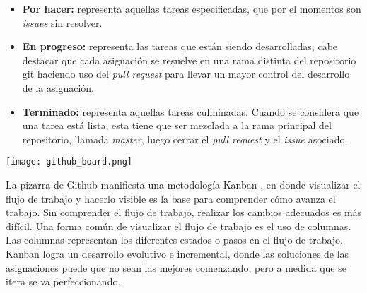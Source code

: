 \begin{itemize}
\item\textbf{Por hacer:} representa aquellas tareas especificadas, que por el momentos son \textit{issues} sin resolver.
\item\textbf{En progreso:} representa las tareas que están siendo desarrolladas, cabe destacar que cada asignación se resuelve en una rama distinta del repositorio git haciendo uso del \textit{pull request} para llevar un mayor control del desarrollo de la asignación.
\item\textbf{Terminado:} representa aquellas tareas culminadas. Cuando se considera que una tarea está lista, esta tiene que ser mezclada a la rama principal del repositorio, llamada \textit{master}, luego cerrar el \textit{pull request} y el \textit{issue} asociado.
\end{itemize}
\bigbreak
\begin{center}
\texttt{[image: github\_board.png]}
\label{fig:githubBoard}
\end{center}
\bigbreak
La pizarra de Github manifiesta una metodología Kanban \cite{BookKanban}, en donde visualizar el flujo de trabajo y hacerlo visible es la base para comprender cómo avanza el trabajo. Sin comprender el flujo de trabajo, realizar los cambios adecuados es más difícil. Una forma común de visualizar el flujo de trabajo es el uso de columnas. Las columnas representan los diferentes estados o pasos en el flujo de trabajo. Kanban logra un desarrollo evolutivo e incremental, donde las soluciones de las asignaciones puede que no sean las mejores comenzando, pero a medida que se itera se va perfeccionando.


